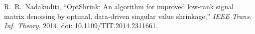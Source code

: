 R.~R.~Nadakuditi,
``OptShrink: An algorithm for improved low-rank signal matrix denoising by
optimal, data-driven singular value shrinkage,''
\emph{IEEE Trans. Inf. Theory}, 2014,
doi: 10.1109/TIT.2014.2311661.
